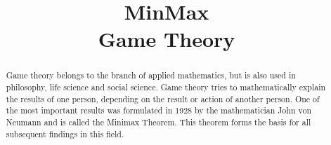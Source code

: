 \documentclass[conference,pdf,table,xcdraw, utf8]{IEEEtran}
\begin{document}
\newcommand{\subtitlerelsize}{1}
\newcommand{\subtitlelinesep}{0.2em}

\title{MinMax\\[\subtitlelinesep]%
    \smaller[\subtitlerelsize]{}Game Theory}
\author{
    \and
    \and
}

\maketitle

\begin{abstract}

    Game theory belongs to the branch of applied mathematics, but is also used in philosophy, life science and social science. Game theory tries to mathematically explain the results of one person, depending on the result or action of another person. One of the most important results was formulated in 1928 by the mathematician John von Neumann and is called the Minimax Theorem. This theorem forms the basis for all subsequent findings in this field.

\end{abstract}



\end{document}
